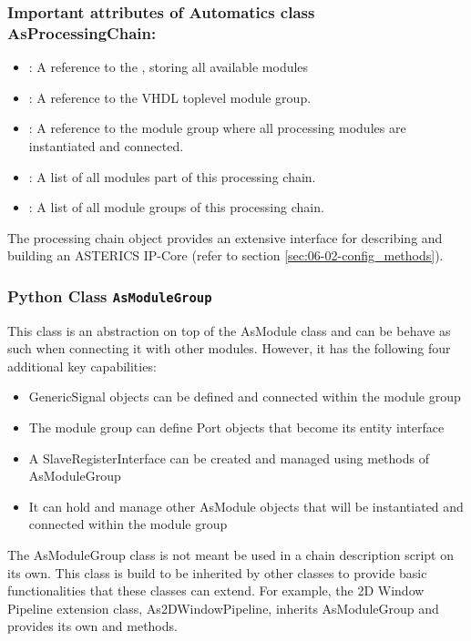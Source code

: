 \subsubsection*{Important attributes of Automatics class AsProcessingChain:}
\begin{itemize}
\item {}: A reference to the , storing all available \asterics modules
\item {}: A reference to the \asterics VHDL toplevel module group.
\item {}: A reference to the  module group where all \asterics processing modules are instantiated and connected.
\item {}: A list of all \asterics modules part of this processing chain.
\item {}: A list of all  module groups of this processing chain.
\end{itemize}

The processing chain object provides an extensive interface for describing and building an ASTERICS IP-Core (refer to section \ref{sec:06-02-config_methods}).


\subsubsection{Python Class \texttt{AsModuleGroup}}

This class is an abstraction on top of the AsModule class and can be behave as such when connecting it with other modules.
However, it has the following four additional key capabilities:
\begin{itemize}
\item GenericSignal objects can be defined and connected within the module group
\item The module group can define Port objects that become its entity interface
\item A SlaveRegisterInterface can be created and managed using methods of AsModuleGroup
\item It can hold and manage other AsModule objects that will be instantiated and connected within the module group
\end{itemize}

The AsModuleGroup class is not meant be used in a chain description script on its own.
This class is build to be inherited by other classes to provide basic functionalities that these classes can extend.
For example, the 2D Window Pipeline extension class, As2DWindowPipeline, inherits AsModuleGroup and provides its own  and  methods.

